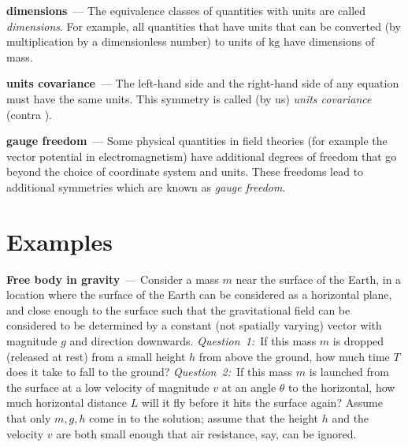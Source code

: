 \documentclass{article}
\newcommand{\unit}[1]{\mathrm{#1}}
\newcommand{\kg}{\unit{kg}}
\renewcommand{\paragraph}[1]{\par\textbf{#1}~---}
\begin{document}
\paragraph{dimensions}
The equivalence classes of quantities with units are called \emph{dimensions}.
For example, all quantities that have units that can be converted (by multiplication by a dimensionless number) to units of $\kg$ have dimensions of mass.

\paragraph{units covariance}
The left-hand side and the right-hand side of any equation must have the same units.
This symmetry is called (by us) \emph{units covariance} (contra \cite{villar2022dimensionless}).

\paragraph{gauge freedom}
Some physical quantities in field theories (for example the vector potential in electromagnetism) have additional degrees of freedom that go beyond the choice of coordinate system and units.
These freedoms lead to additional symmetries which are known as \emph{gauge freedom}.

\section{Examples}

\paragraph{Free body in gravity}
Consider a mass $m$ near the surface of the Earth, in a location where the surface of the Earth can be considered as a horizontal plane, and close enough to the surface such that the gravitational field can be considered to be determined by a constant (not spatially varying) vector with magnitude $g$ and direction downwards.
\textsl{Question~1:}~If this mass $m$ is dropped (released at rest) from a small height $h$ from above the ground, how much time $T$ does it take to fall to the ground?
\textsl{Question~2:}~If this mass $m$ is launched from the surface at a low velocity of magnitude $v$ at an angle $\theta$ to the horizontal, how much horizontal distance $L$ will it fly before it hits the surface again?
Assume that only $m, g, h$ come in to the solution; assume that the height $h$ and the velocity $v$ are both small enough that air resistance, say, can be ignored.
\end{document}
